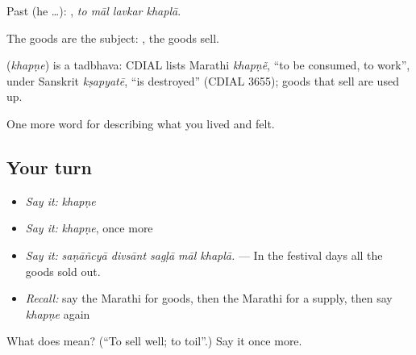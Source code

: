 Past (he …):    , \emph{to māl lavkar khaplā}.

The goods are the subject:  , the goods sell.

\begin{cousinweb}
\textbf{} (\emph{khapṇe}) is a tadbhava: CDIAL lists Marathi \emph{khapṇẽ}, \textquotedblleft{}to be consumed, to work\textquotedblright{}, under Sanskrit \emph{kṣapyatē}, \textquotedblleft{}is destroyed\textquotedblright{} (CDIAL 3655); goods that sell are used up.
\end{cousinweb}

\begin{grammarlens}[title={What you've built}]
One more word for describing what you lived and felt.
\end{grammarlens}

\subsection*{Your turn}
\begin{itemize}
\raggedright
  \item \emph{Say it:} \emph{khapṇe}
  \item \emph{Say it:} \emph{khapṇe}, once more
  \item \emph{Say it:} \emph{saṇāñcyā divsānt sagḷā māl khaplā.} — In the festival days all the goods sold out.
  \item \emph{Recall:} say the Marathi for goods, then the Marathi for a supply, then say \emph{khapṇe} again
\end{itemize}

\begin{tcolorbox}[breakable,colback=teal!4,colframe=teal!35!black,title={Before you move on}]
What does  mean? (\textquotedblleft{}To sell well; to toil\textquotedblright{}.) Say it once more.
\end{tcolorbox}
